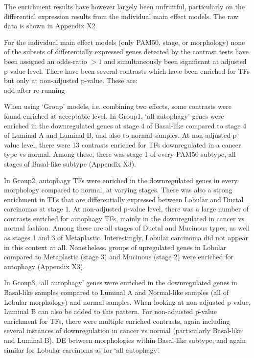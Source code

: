         The enrichment results have however largely been unfruitful, particularly on the differential expression results from the individual main effect models. The raw data is shown in Appendix X2. 
        
        For the individual main effect models (only PAM50, stage, or morphology) none of the subsets of differentially expressed genes detected by the contrast tests have been assigned an odds-ratio $>1$ and simultaneously been significant at adjusted p-value level. There have been several contrasts which have been enriched for TFs but only at non-adjusted p-value. These are: \\
        
        {add after re-running}
        
        
        When using ‘Group’ models, i.e. combining two effects, some contrasts were found enriched at acceptable level. In Group1, ‘all autophagy’ genes were enriched in the downregulated genes at stage 4 of Basal-like compared to stage 4 of Luminal A and Luminal B, and also to normal samples. At non-adjusted p-value level, there were 13 contrasts enriched for TFs downregulated in a cancer type vs normal. Among these, there was stage 1 of every PAM50 subtype, all stages of Basal-like subtype (Appendix X3). 
         
        In Group2, autophagy TFs were enriched in the downregulated genes in every morphology compared to normal, at varying stages. There was also a strong enrichment in TFs that are differentially expressed between Lobular and Ductal carcinomas at stage 1. At non-adjusted p-value level, there was a large number of contrasts enriched for autophagy TFs, mainly in the downregulated in cancer vs normal fashion. Among these are all stages of Ductal and Mucinous types, as well as stages 1 and 3 of Metaplastic. Interestingly, Lobular carcinoma did not appear in this context at all. Nonetheless, groups of upregulated genes in Lobular compared to Metaplastic (stage 3) and Mucinous (stage 2) were enriched for autophagy (Appendix X3). 
        
        In Group3, ‘all autophagy’ genes were enriched in the downregulated genes in Basal-like samples compared to Luminal A and Normal-like samples (all of Lobular morphology) and normal samples. When looking at non-adjusted p-value, Luminal B can also be added to this pattern. For non-adjusted p-value enrichment for TFs, there were multiple enriched contrasts, again including several instances of downregulation in cancer vs normal (particularly Basal-like and Luminal B), DE between morphologies within Basal-like subtype, and again similar for Lobular carcinoma as for ‘all autophagy’.
        
